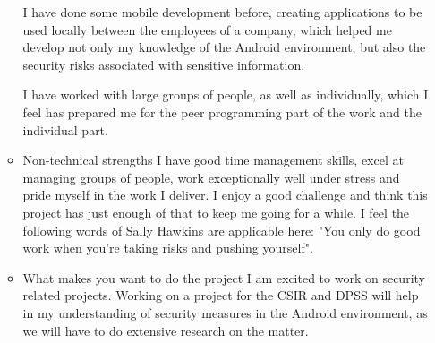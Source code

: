 \documentclass[12pt, oneside]{article}
\begin{document}
\begin{enumerate}
\begin{itemize}
				I have done some mobile development before, creating applications to be used locally between the employees of a company, which helped me 
				develop not only my knowledge of the Android environment, but also the security risks associated with sensitive information.
				
				I have worked with large groups of people, as well as individually, which I feel has prepared me for the peer programming part of the work and the individual part.\newline
			\item Non-technical strengths\newline\newline
				I have good time management skills, excel at managing groups of people, work exceptionally well under stress
				and pride myself in the work I deliver.
				I enjoy a good challenge and think this project has just enough of that to keep me going for a while. I feel the following words of Sally Hawkins are applicable here: "You only do good work when you're taking risks and pushing yourself".
			\item What makes you want to do the project\newline\newline
				I am excited to work on security related projects. Working on a project for the CSIR and DPSS will help in my understanding of security measures in the Android environment, as we will have to do extensive research on the matter.
				

\end{itemize}
\end{enumerate}
\end{document}
